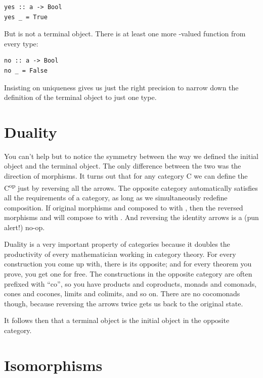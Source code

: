 \begin{verbatim}
yes :: a -> Bool
yes _ = True
\end{verbatim}
But  is not a terminal object. There is at least one more
-valued function from every type:

\begin{verbatim}
no :: a -> Bool
no _ = False
\end{verbatim}
Insisting on uniqueness gives us just the right precision to narrow down
the definition of the terminal object to just one type.

\section{Duality}\label{duality}

You can't help but to notice the symmetry between the way we defined the
initial object and the terminal object. The only difference between the
two was the direction of morphisms. It turns out that for any category C
we can define the  C\textsuperscript{op} just by
reversing all the arrows. The opposite category automatically satisfies
all the requirements of a category, as long as we simultaneously
redefine composition. If original morphisms
 and  composed
to  with , then the reversed
morphisms  and
 will compose to
 with . And reversing
the identity arrows is a (pun alert!) no-op.

Duality is a very important property of categories because it doubles
the productivity of every mathematician working in category theory. For
every construction you come up with, there is its opposite; and for
every theorem you prove, you get one for free. The constructions in the
opposite category are often prefixed with ``co'', so you have products
and coproducts, monads and comonads, cones and cocones, limits and
colimits, and so on. There are no cocomonads though, because reversing
the arrows twice gets us back to the original state.

It follows then that a terminal object is the initial object in the
opposite category.

\section{Isomorphisms}\label{isomorphisms}

